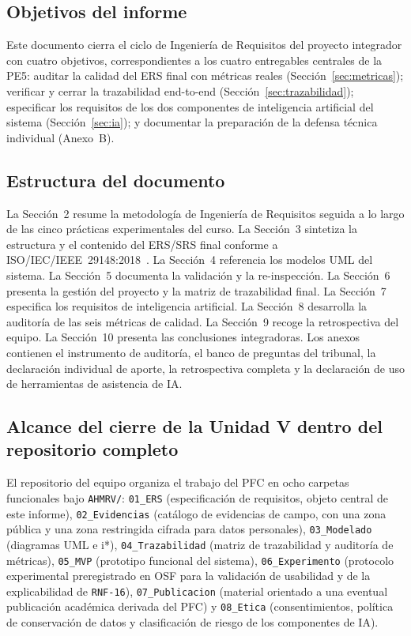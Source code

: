 \documentclass[11pt,a4paper]{article}
\newcommand{\id}[1]{\texttt{#1}}
\begin{document}
\subsection{Objetivos del informe}

Este documento cierra el ciclo de Ingeniería de Requisitos del proyecto integrador con cuatro
objetivos, correspondientes a los cuatro entregables centrales de la PE5: auditar la calidad del
ERS final con métricas reales (Sección~\ref{sec:metricas}); verificar y cerrar la trazabilidad
end-to-end (Sección~\ref{sec:trazabilidad}); especificar los requisitos de los dos componentes de
inteligencia artificial del sistema (Sección~\ref{sec:ia}); y documentar la preparación de la
defensa técnica individual (Anexo~B).

\subsection{Estructura del documento}

La Sección~2 resume la metodología de Ingeniería de Requisitos seguida a lo largo de las cinco
prácticas experimentales del curso. La Sección~3 sintetiza la estructura y el contenido del ERS/SRS
final conforme a ISO/IEC/IEEE~29148:2018~\cite{iso29148}. La Sección~4 referencia los modelos UML
del sistema. La Sección~5 documenta la validación y la re-inspección. La Sección~6 presenta la
gestión del proyecto y la matriz de trazabilidad final. La Sección~7 especifica los requisitos de
inteligencia artificial. La Sección~8 desarrolla la auditoría de las seis métricas de calidad. La
Sección~9 recoge la retrospectiva del equipo. La Sección~10 presenta las conclusiones integradoras.
Los anexos contienen el instrumento de auditoría, el banco de preguntas del tribunal, la
declaración individual de aporte, la retrospectiva completa y la declaración de uso de herramientas
de asistencia de IA.

\subsection{Alcance del cierre de la Unidad V dentro del repositorio completo}

El repositorio del equipo organiza el trabajo del PFC en ocho carpetas funcionales bajo
\id{AHMRV/}: \id{01\_ERS} (especificación de requisitos, objeto central de este informe),
\id{02\_Evidencias} (catálogo de evidencias de campo, con una zona pública y una zona restringida
cifrada para datos personales), \id{03\_Modelado} (diagramas UML e i*), \id{04\_Trazabilidad}
(matriz de trazabilidad y auditoría de métricas), \id{05\_MVP} (prototipo funcional del sistema),
\id{06\_Experimento} (protocolo experimental preregistrado en OSF para la validación de usabilidad
y de la explicabilidad de \id{RNF-16}), \id{07\_Publicacion} (material orientado a una eventual
publicación académica derivada del PFC) y \id{08\_Etica} (consentimientos, política de conservación
de datos y clasificación de riesgo de los componentes de IA).
\end{document}
